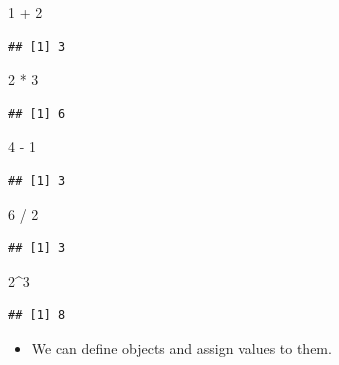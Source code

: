 \documentclass[
]{book}
\newenvironment{Shaded}{\begin{snugshade}}{\end{snugshade}}
\newcommand{\DecValTok}[1]{\textcolor[rgb]{0.00,0.00,0.81}{#1}}
\newcommand{\SpecialCharTok}[1]{\textcolor[rgb]{0.00,0.00,0.00}{#1}}
\providecommand{\tightlist}{%
  \setlength{\itemsep}{0pt}\setlength{\parskip}{0pt}}
\begin{document}
\begin{Shaded}
\begin{Highlighting}[]
\DecValTok{1} \SpecialCharTok{+} \DecValTok{2}
\end{Highlighting}
\end{Shaded}

\begin{verbatim}
## [1] 3
\end{verbatim}

\begin{Shaded}
\begin{Highlighting}[]
\DecValTok{2} \SpecialCharTok{*} \DecValTok{3}
\end{Highlighting}
\end{Shaded}

\begin{verbatim}
## [1] 6
\end{verbatim}

\begin{Shaded}
\begin{Highlighting}[]
\DecValTok{4} \SpecialCharTok{{-}} \DecValTok{1}
\end{Highlighting}
\end{Shaded}

\begin{verbatim}
## [1] 3
\end{verbatim}

\begin{Shaded}
\begin{Highlighting}[]
\DecValTok{6} \SpecialCharTok{/} \DecValTok{2}
\end{Highlighting}
\end{Shaded}

\begin{verbatim}
## [1] 3
\end{verbatim}

\begin{Shaded}
\begin{Highlighting}[]
\DecValTok{2}\SpecialCharTok{\^{}}\DecValTok{3}
\end{Highlighting}
\end{Shaded}

\begin{verbatim}
## [1] 8
\end{verbatim}

\begin{itemize}
\tightlist
\item
  We can define objects and assign values to them.
\end{itemize}
\end{document}
